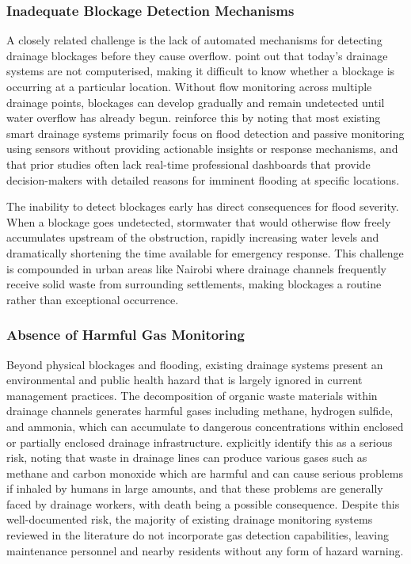 \documentclass[12pt, a4paper]{article}
\begin{document}
\subsubsection{Inadequate Blockage Detection Mechanisms}

A closely related challenge is the lack of automated mechanisms for detecting drainage blockages before they cause overflow. \citet{sonawane2018} point out that today's drainage systems are not computerised, making it difficult to know whether a blockage is occurring at a particular location. Without flow monitoring across multiple drainage points, blockages can develop gradually and remain undetected until water overflow has already begun. \citet{nageye2025} reinforce this by noting that most existing smart drainage systems primarily focus on flood detection and passive monitoring using sensors without providing actionable insights or response mechanisms, and that prior studies often lack real-time professional dashboards that provide decision-makers with detailed reasons for imminent flooding at specific locations.

The inability to detect blockages early has direct consequences for flood severity. When a blockage goes undetected, stormwater that would otherwise flow freely accumulates upstream of the obstruction, rapidly increasing water levels and dramatically shortening the time available for emergency response. This challenge is compounded in urban areas like Nairobi where drainage channels frequently receive solid waste from surrounding settlements, making blockages a routine rather than exceptional occurrence.

\subsubsection{Absence of Harmful Gas Monitoring}

Beyond physical blockages and flooding, existing drainage systems present an environmental and public health hazard that is largely ignored in current management practices. The decomposition of organic waste materials within drainage channels generates harmful gases including methane, hydrogen sulfide, and ammonia, which can accumulate to dangerous concentrations within enclosed or partially enclosed drainage infrastructure. \citet{sonawane2018} explicitly identify this as a serious risk, noting that waste in drainage lines can produce various gases such as methane and carbon monoxide which are harmful and can cause serious problems if inhaled by humans in large amounts, and that these problems are generally faced by drainage workers, with death being a possible consequence. Despite this well-documented risk, the majority of existing drainage monitoring systems reviewed in the literature do not incorporate gas detection capabilities, leaving maintenance personnel and nearby residents without any form of hazard warning.
\end{document}
